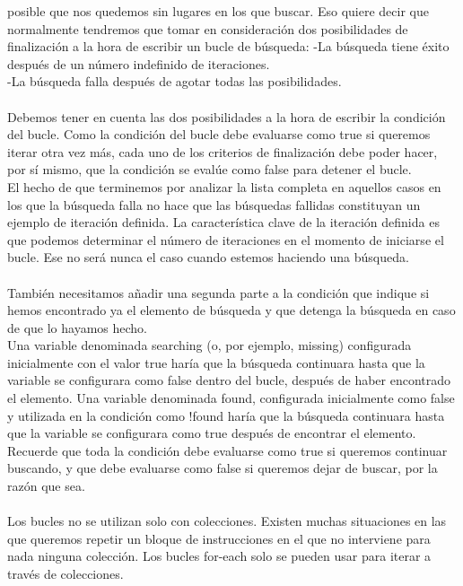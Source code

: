 \documentclass[11pt,a4paper]{article}
\begin{document}
	posible que nos quedemos sin lugares en los que buscar. Eso quiere decir que normalmente tendremos
	que tomar en consideración dos posibilidades de finalización a la hora de escribir un bucle
	de búsqueda: -La búsqueda tiene éxito después de un número indefinido de iteraciones.\\
	-La búsqueda falla después de agotar todas las posibilidades.\\
	\\Debemos tener en cuenta las dos posibilidades a la hora de escribir la condición del bucle. Como
	la condición del bucle debe evaluarse como true si queremos iterar otra vez más, cada uno de los
	criterios de finalización debe poder hacer, por sí mismo, que la condición se evalúe como false
	para detener el bucle. \\
	El hecho de que terminemos por analizar la lista completa en aquellos casos en los que la búsqueda
	falla no hace que las búsquedas fallidas constituyan un ejemplo de iteración definida. La característica
	clave de la iteración definida es que podemos determinar el número de iteraciones en el
	momento de iniciarse el bucle. Ese no será nunca el caso cuando estemos haciendo una búsqueda.\\
	\\
	También necesitamos añadir una segunda parte a la condición que indique si hemos encontrado
	ya el elemento de búsqueda y que detenga la búsqueda en caso de que lo hayamos hecho.\\
	Una variable denominada searching (o, por ejemplo, missing) configurada inicialmente con
	el valor true haría que la búsqueda continuara hasta que la variable se configurara como false
	dentro del bucle, después de haber encontrado el elemento. Una variable denominada found, configurada inicialmente como false y utilizada en la condición
	como !found haría que la búsqueda continuara hasta que la variable se configurara como
	true después de encontrar el elemento. Recuerde que toda la condición debe evaluarse como true si queremos continuar buscando, y que
	debe evaluarse como false si queremos dejar de buscar, por la razón que sea.\\
	\\
	Los bucles no se utilizan solo con colecciones. Existen muchas situaciones en las que queremos
	repetir un bloque de instrucciones en el que no interviene para nada ninguna colección. Los bucles for-each solo se pueden usar para iterar a través de colecciones.\\
	\\
\end{document}
